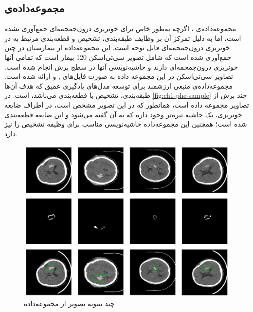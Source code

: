  \subsection{مجموعه‌داده‌ی }
 مجموعه‌داده‌ی 
 \cite{PHE_ma2024phe}
 ، اگرچه به‌طور خاص برای خونریزی درون‌جمجمه‌ای جمع‌آوری نشده است، اما به دلیل تمرکز آن بر وظایف طبقه‌بندی، تشخیص و قطعه‌بندی مرتبط به 
  در خونریزی‌ درون‌جمجمه‌ای قابل توجه است. این مجموعه‌داده‌ از بیمارستان 
  در چین جمع‌آوری شده است که 
   شامل تصویر سی‌تی‌اسکن 120 بیمار است که تمامی آنها خونریزی درون‌جمجمه‌ای دارند و حاشیه‌نویسی آنها در سطج برش انجام شده است. تصاویر سی‌تی‌اسکن در این مجموعه داده به صورت فایل‌های 
   ,
    و
   ارائه شده است. مجموعه‌داده‌ی 
    منبعی ارزشمند برای توسعه مدل‌های یادگیری عمیق که هدف آن‌ها طبقه‌بندی، تشخیص یا قطعه‌بندی می‌باشد، است. در
   \autoref{fig:ch1-phe-sample}
 چند برش از تصاویر مجموعه داده 
 است، همانطور که در این تصویر مشخص است،‌ در اطراف ضایعه خونریزی،‌ یک حاشیه تیره‌تر وجود داره که به آن 
 گفته می‌شود و این ضایعه قطعه‌بندی شده است؛ همچنین این مجموعه‌داده حاشیه‌نویسی مناسب برای وظیفه تشخیص را نیز دارد.
 \begin{figure}[H]
 \centering
 \includegraphics[width=1.0\linewidth]{"Images/Chapter1/PHE sample"}
 \caption{چند نمونه تصویر از مجموعه‌داده 
 }
 \label{fig:ch1-phe-sample}
 \end{figure}
 
